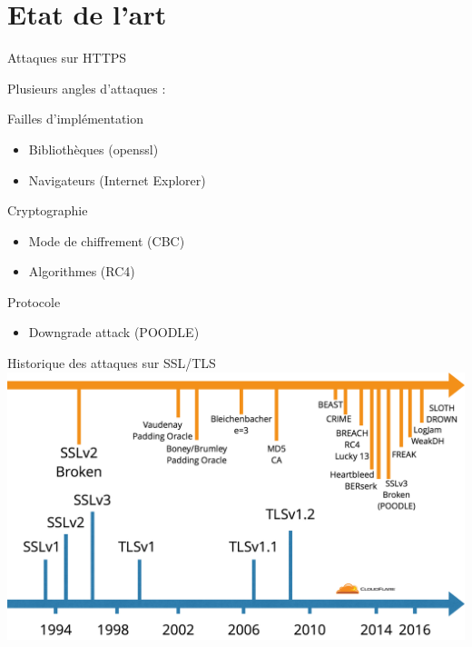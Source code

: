\section{Etat de l'art}


\begin{frame}{Attaques sur HTTPS}

  {\Large \centerline{Plusieurs angles d'attaques :}}

  \begin{exampleblock}{Failles d'implémentation}
    \begin{itemize}
    \item Bibliothèques (openssl)
    \item Navigateurs (Internet Explorer)
    \end{itemize}
    \end{exampleblock}

  \begin{exampleblock}{Cryptographie}
    \begin{itemize}
    \item Mode de chiffrement (CBC)
    \item Algorithmes (RC4)
    \end{itemize}
  \end{exampleblock}

  \begin{exampleblock}{Protocole}
    \begin{itemize}
      \item{Downgrade attack (POODLE)}
    \end{itemize}
  \end{exampleblock}

\end{frame}


\begin{frame}{Historique des attaques sur SSL/TLS}
    \includegraphics[width=\linewidth]{../medias/history-tls-attacks.png}
\end{frame}
